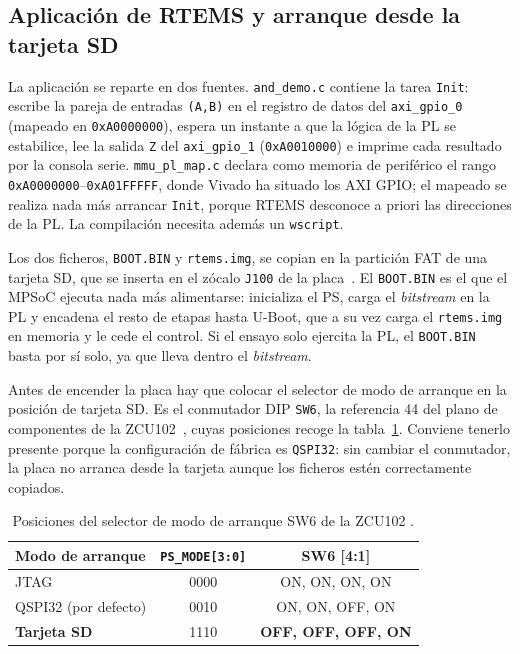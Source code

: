 \subsection{Aplicación de RTEMS y arranque desde la tarjeta SD}

La aplicación se reparte en dos fuentes. \texttt{and\_demo.c} contiene la tarea \texttt{Init}:
escribe la pareja de entradas \texttt{(A,B)} en el registro de datos del \texttt{axi\_gpio\_0}
(mapeado en \texttt{0xA0000000}), espera un instante a que la lógica de la PL se estabilice, lee la
salida \texttt{Z} del \texttt{axi\_gpio\_1} (\texttt{0xA0010000}) e imprime cada resultado por la
consola serie. \texttt{mmu\_pl\_map.c} declara como memoria de periférico el rango
\texttt{0xA0000000}--\texttt{0xA01FFFFF}, donde Vivado ha situado los AXI GPIO; el mapeado se
realiza nada más arrancar \texttt{Init}, porque RTEMS desconoce a priori las direcciones de la PL.
La compilación necesita además un \texttt{wscript}.

Los dos ficheros, \texttt{BOOT.BIN} y \texttt{rtems.img}, se copian en la partición FAT de una
tarjeta SD, que se inserta en el zócalo \texttt{J100} de la placa~\cite{xilinx2023ug1182}. El
\texttt{BOOT.BIN} es el que el MPSoC ejecuta nada más alimentarse: inicializa el PS, carga el
\textit{bitstream} en la PL y encadena el resto de etapas hasta U-Boot, que a su vez carga el
\texttt{rtems.img} en memoria y le cede el control. Si el ensayo solo ejercita la PL, el
\texttt{BOOT.BIN} basta por sí solo, ya que lleva dentro el \textit{bitstream}.

Antes de encender la placa hay que colocar el selector de modo de arranque en la posición de
tarjeta SD. Es el conmutador DIP \texttt{SW6}, la referencia 44 del plano de componentes de la
ZCU102~\cite{xilinx2023ug1182}, cuyas posiciones recoge la tabla~\ref{tab:sw6}. Conviene tenerlo
presente porque la configuración de fábrica es \texttt{QSPI32}: sin cambiar el conmutador, la
placa no arranca desde la tarjeta aunque los ficheros estén correctamente copiados.

\begin{table}[H]
    \centering
    \begin{tabular}{lcc}
        \hline
        \textbf{Modo de arranque} & \textbf{\texttt{PS\_MODE[3:0]}} & \textbf{SW6 [4:1]} \\
        \hline
        JTAG                      & 0000 & ON, ON, ON, ON \\
        QSPI32 (por defecto)      & 0010 & ON, ON, OFF, ON \\
        \textbf{Tarjeta SD}       & 1110 & \textbf{OFF, OFF, OFF, ON} \\
        \hline
    \end{tabular}
    \caption{Posiciones del selector de modo de arranque SW6 de la ZCU102
    \cite{xilinx2023ug1182}.}
    \label{tab:sw6}
\end{table}

